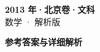 \documentclass[zihao=-4, a4paper]{ctexart}
\begin{document}
\begin{center}
  {\Large\bfseries 2013 年·北京卷·文科}\\[4pt]
  {\large 数学 · 解析版}
\end{center}
\medskip
{}

\clearpage
{}
\begin{center}{\Large\bfseries 参考答案与详细解析}\end{center}
\medskip

\end{document}
